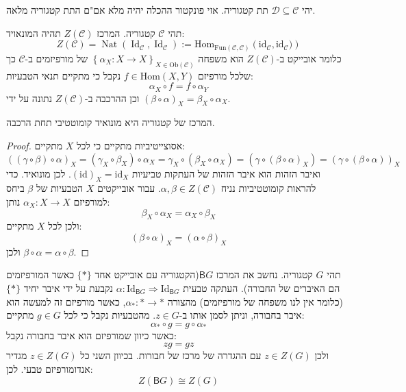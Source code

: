 \documentclass{tstextbook}
\begin{document}
\begin{proposition}
יהי \(\mathcal{D}\subseteq \mathcal{C}\) תת קטגוריה. אזי פונקטור ההכלה יהיה מלא אם"ם התת קטגוריה מלאה.

\end{proposition}
\begin{definition}
תהי \(\mathcal{C}\) קטגוריה. המרכז \(Z\left( \mathcal{C} \right)\) תהיה המונאויד:
$$Z\left( {\mathcal{C}} \right)=\operatorname{Nat}\left( \operatorname{Id}_{{\mathcal{C}}},\operatorname{Id}_{{\mathcal{C}}} \right):= \mathrm{Hom}_{\mathrm{Fun}\left( \mathcal{C} ,\mathcal{C}  \right)}\left( \mathrm{id}_{\mathcal{C} },\mathrm{id}_{\mathcal{C} }) \right)$$
כלומר אובייקט ב-\(Z\left( \mathcal{C} \right)\) הוא משפחה \(\left\{  \alpha_{X}:X \to X \right\}_{X \in \mathrm{Ob}\left( \mathcal{C} \right)}\) של מורפיזמים ב-\(\mathcal{C}\) כך שלכל מורפיזם \(f\in \mathrm{Hom}(X,Y)\) נקבל כי מתקיים תנאי הטבעיות:
$$\alpha_{X}\circ  f=f\circ  \alpha_{Y}$$
וכן ההרכבה ב-\(Z\left( \mathcal{C} \right)\) נתונה על ידי \((\beta \circ \alpha)_X = \beta_X \circ \alpha_X\).

\end{definition}
\begin{proposition}
המרכז של קטגוריה היא מונואיד קומוטטיבי תחת הרכבה.

\end{proposition}
\begin{proof}
אסוצייטיביות מתקיים כי לכל \(X\) מתקיים:
$$\left( \left( \gamma\circ\beta \right)\circ\alpha \right)_{X}=\left( \gamma_{X}\circ\beta_{X} \right)\circ\alpha_{X}=\gamma_{X}\circ\left( \beta_{X}\circ\alpha_{X} \right)=\left( \gamma\circ\left( \beta\circ\alpha \right)_{X} \right)=\left( \gamma \circ \left( \beta \circ  \alpha \right) \right)_{X}$$
ואיבר הזהות הוא איבר הזהות של העתקות  טביעיות \(\left( \mathrm{id} \right)_{X}=\mathrm{id}_{X}\). לכן מונואיד. כדי להראות קומוטטיביות נניח \(\alpha,\beta \in Z\left( \mathcal{C} \right)\). עבור אובייקטים \(X\) הטבעיות של \(\beta\) ביחס למורפיזם \(\alpha_{X}:X\to X\) נותן:
$$\beta_{X}\circ\alpha_{X}=\alpha_{X}\circ\beta_{X}$$
ולכן לכל \(X\) מתקיים:
$$\left( \beta \circ \alpha \right)_{X}=\left( \alpha \circ \beta \right)_{X}$$
ולכן \(\beta \circ \alpha=\alpha \circ \beta\).

\end{proof}
\begin{example}
תהי \(G\) קטגוריה. נחשב את המרכז \(\mathsf{B}G\)(הקטגוריה עם אובייקט אחד \(\{ * \}\) כאשר המורפיזמים הם האיברים של החבורה). העתקה טבעית \(\alpha:\mathrm{Id}_{\mathsf{B}G}\Rightarrow\mathrm{Id}_{\mathsf{B}G}\) נקבעת על ידי איבר יחיד \(\{ * \}\)(כלומר אין לנו משפחה של מורפיזמים) מהצורה \(\alpha_{*}:*\to *\), כאשר מורפיזם זה למעשה הוא איבר בחבורה, וניתן לסמן אותו ב-\(z \in G\). מהטבעיות נקבל כי לכל \(g \in G\) מתקיים:
$$\alpha_{*}\circ g=g\circ\alpha_{*}$$
כאשר כיוון שמורפיזם הוא איבר בחבורה נקבל:
$$zg=gz$$
ולכן \(z \in Z(G)\) עם ההגדרה של מרכז של חבורות. בכיוון השני כל \(z \in Z(G)\) מגדיר אנדומורפיזם טבעי. לכן:
$$Z\left( \mathsf{B}G \right)\cong  Z(G)$$

\end{example}
\end{document}
